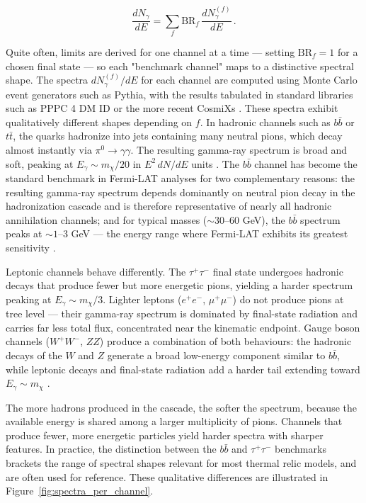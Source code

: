 \begin{equation}
	\frac{dN_\gamma}{dE} = \sum_f \text{BR}_f \, \frac{dN_\gamma^{(f)}}{dE} \,.
	\label{eq:spectrum_sum}
\end{equation}

Quite often, limits are derived for one channel at a time --- setting $\text{BR}_f = 1$ for a chosen final state --- so each "benchmark channel" maps to a distinctive spectral shape.
The spectra $dN_\gamma^{(f)}/dE$ for each channel are computed using Monte Carlo event generators such as Pythia, with the results tabulated in standard libraries such as PPPC 4 DM ID \cite{Cirelli:2010xx} or the more recent CosmiXs \cite{Arina:2023eic}.
These spectra exhibit qualitatively different shapes depending on $f$.
In hadronic channels such as $b\bar{b}$ or $t\bar{t}$, the quarks hadronize into jets containing many neutral pions, which decay almost instantly via $\pi^0 \to \gamma\gamma$.
The resulting gamma-ray spectrum is broad and soft, peaking at $E_\gamma \sim m_\chi / 20$ in $E^2 \, dN/dE$ units \cite{Cirelli:2024ssz}.
The $b\bar{b}$ channel has become the standard benchmark in Fermi-LAT analyses for two complementary reasons: the resulting gamma-ray spectrum depends dominantly on neutral pion decay in the hadronization cascade and is therefore representative of nearly all hadronic annihilation channels; and for typical \WIMP masses ($\sim 30$--$60$ GeV), the $b\bar{b}$ spectrum peaks at $\sim 1$--$3$ GeV --- the energy range where Fermi-LAT exhibits its greatest sensitivity \cite{Hooper:2024}.

Leptonic channels behave differently.
The $\tau^+\tau^-$ final state undergoes hadronic decays that produce fewer but more energetic pions, yielding a harder spectrum peaking at $E_\gamma \sim m_\chi / 3$.
Lighter leptons ($e^+e^-$, $\mu^+\mu^-$) do not produce pions at tree level --- their gamma-ray spectrum is dominated by final-state radiation and carries far less total flux, concentrated near the kinematic endpoint.
Gauge boson channels ($W^+W^-$, $ZZ$) produce a combination of both behaviours: the hadronic decays of the $W$ and $Z$ generate a broad low-energy component similar to $b\bar{b}$, while leptonic decays and final-state radiation add a harder tail extending toward $E_\gamma \sim m_\chi$ \cite{Hooper:2024}.

The more hadrons produced in the cascade, the softer the spectrum, because the available energy is shared among a larger multiplicity of pions.
Channels that produce fewer, more energetic particles yield harder spectra with sharper features.
In practice, the distinction between the $b\bar{b}$ and $\tau^+\tau^-$ benchmarks brackets the range of spectral shapes relevant for most thermal relic models, and are often used for reference.
These qualitative differences are illustrated in Figure~\ref{fig:spectra_per_channel}.


